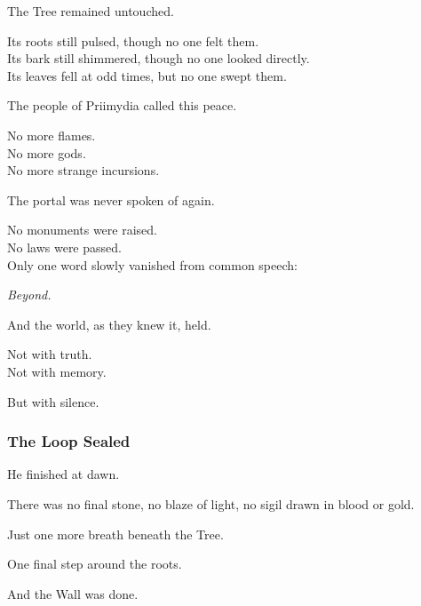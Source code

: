 \documentclass[12pt]{article}
\begin{document}
\vspace{0.5em}
The Tree remained untouched.

\vspace{0.5em}
Its roots still pulsed, though no one felt them.\\
Its bark still shimmered, though no one looked directly.\\
Its leaves fell at odd times, but no one swept them.

\vspace{0.5em}
The people of Priimydia called this peace.

\vspace{0.5em}
No more flames.\\
No more gods.\\
No more strange incursions.

\vspace{0.5em}
The portal was never spoken of again.

\vspace{0.5em}
No monuments were raised.\\
No laws were passed.\\
Only one word slowly vanished from common speech:

\vspace{0.5em}
\textit{Beyond.}

\vspace{0.5em}
And the world, as they knew it, held.

\vspace{0.5em}
Not with truth.\\
Not with memory.

\vspace{0.5em}
But with silence.

\dotfill

\subsubsection*{The Loop Sealed}

He finished at dawn.

\vspace{0.5em}
There was no final stone, no blaze of light, no sigil drawn in blood or gold.

\vspace{0.5em}
Just one more breath beneath the Tree.

\vspace{0.5em}
One final step around the roots.

\vspace{0.5em}
And the Wall was done.
\end{document}
